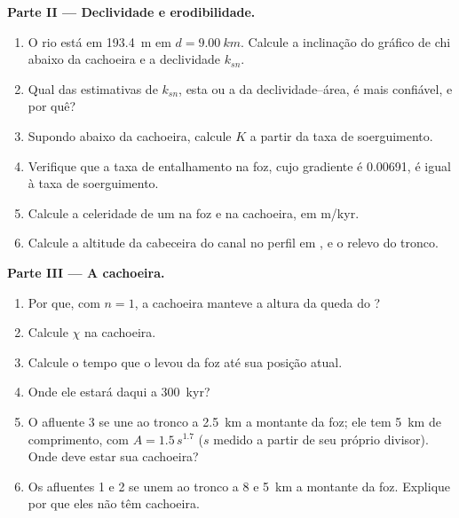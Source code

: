 \begin{problem}
\medskip\noindent\textbf{Parte II --- Declividade e erodibilidade.}
\begin{enumerate}[resume]
\item O rio está em \qty{193.4}{m} em $d = \qty{9.00}{km}$. Calcule a
  inclinação do gráfico de chi abaixo da cachoeira e a declividade $k_{sn}$.
\item Qual das estimativas de $k_{sn}$, esta ou a da declividade--área, é mais
  confiável, e por quê?
\item Supondo  abaixo da cachoeira, calcule $K$ a partir da
  taxa de soerguimento.
\item Verifique que a taxa de entalhamento na foz, cujo gradiente é
  0.00691, é igual à taxa de soerguimento.
\item Calcule a celeridade de um  na foz e na
  cachoeira, em m/kyr.
\item Calcule a altitude da cabeceira do canal no perfil em , e o
  relevo do tronco.
\end{enumerate}

\medskip\noindent\textbf{Parte III --- A cachoeira.}
\begin{enumerate}[resume]
\item Por que, com $n = 1$, a cachoeira manteve a altura da queda do
  ?
\item Calcule $\chi$ na cachoeira.
\item Calcule o tempo que o  levou da foz até sua
  posição atual.
\item Onde ele estará daqui a \qty{300}{kyr}?
\item O afluente 3 se une ao tronco a \qty{2.5}{km} a montante da foz; ele
  tem \qty{5}{km} de comprimento, com $A = 1.5\,s^{1.7}$ ($s$ medido a partir de seu próprio divisor).
  Onde deve estar sua cachoeira?
\item Os afluentes 1 e 2 se unem ao tronco a 8 e \qty{5}{km} a montante da
  foz. Explique por que eles não têm cachoeira.
\end{enumerate}


\end{problem}
